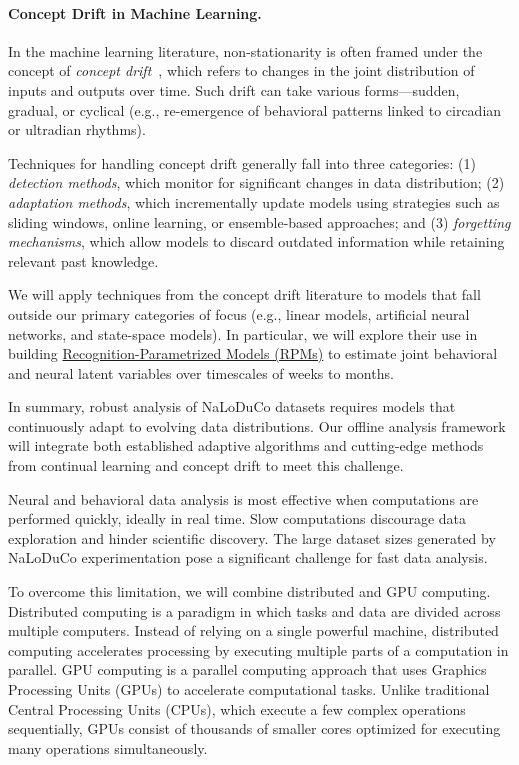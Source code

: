 \paragraph{Concept Drift in Machine Learning.}

In the machine learning literature, non-stationarity is often framed under the
concept of \emph{concept drift}~\citep{conceptdriftReview}, which refers to
changes in the joint distribution of inputs and outputs over time. Such drift
can take various forms—sudden, gradual, or cyclical (e.g., re-emergence of
behavioral patterns linked to circadian or ultradian rhythms).

Techniques for handling concept drift generally fall into three categories: (1)
\emph{detection methods}, which monitor for significant changes in data
distribution; (2) \emph{adaptation methods}, which incrementally update models
using strategies such as sliding windows, online learning, or ensemble-based
approaches; and (3) \emph{forgetting mechanisms}, which allow models to discard
outdated information while retaining relevant past knowledge.

We will apply techniques from the concept drift literature to models that fall
outside our primary categories of focus (e.g., linear models, artificial neural
networks, and state-space models). In particular, we will explore their use in
building
\href{https://github.com/gatsby-sahani/rpm-aistats-2023}{Recognition-Parametrized
Models (RPMs)} to estimate joint behavioral and neural latent variables over
timescales of weeks to months.

In summary, robust analysis of NaLoDuCo datasets requires models that
continuously adapt to evolving data distributions. Our offline analysis
framework will integrate both established adaptive algorithms and cutting-edge
methods from continual learning and concept drift to meet this challenge.


Neural and behavioral data analysis is most effective when computations are
performed quickly, ideally in real time. Slow computations discourage data
exploration and hinder scientific discovery. The large dataset sizes generated by
NaLoDuCo experimentation pose a significant challenge for fast data analysis.

To overcome this limitation, we will combine distributed and GPU computing.
%
Distributed computing is a paradigm
in which tasks and data are divided across multiple computers. Instead of
relying on a single powerful machine, distributed computing accelerates
processing by executing multiple parts of a computation in parallel.
%
GPU computing is a parallel computing approach that uses Graphics Processing
Units (GPUs) to accelerate computational tasks. Unlike traditional Central
Processing Units (CPUs), which execute a few complex operations sequentially,
GPUs consist of thousands of smaller cores optimized for executing many
operations simultaneously.

